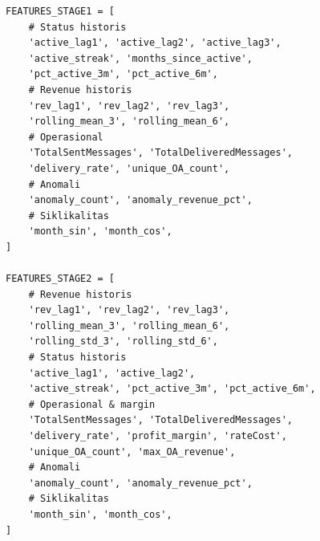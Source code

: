 \begin{lstlisting}[style=pycode,caption={Definisi daftar fitur Stage 1 dan Stage 2}]
FEATURES_STAGE1 = [
    # Status historis
    'active_lag1', 'active_lag2', 'active_lag3',
    'active_streak', 'months_since_active',
    'pct_active_3m', 'pct_active_6m',
    # Revenue historis
    'rev_lag1', 'rev_lag2', 'rev_lag3',
    'rolling_mean_3', 'rolling_mean_6',
    # Operasional
    'TotalSentMessages', 'TotalDeliveredMessages',
    'delivery_rate', 'unique_OA_count',
    # Anomali
    'anomaly_count', 'anomaly_revenue_pct',
    # Siklikalitas
    'month_sin', 'month_cos',
]

FEATURES_STAGE2 = [
    # Revenue historis
    'rev_lag1', 'rev_lag2', 'rev_lag3',
    'rolling_mean_3', 'rolling_mean_6',
    'rolling_std_3', 'rolling_std_6',
    # Status historis
    'active_lag1', 'active_lag2',
    'active_streak', 'pct_active_3m', 'pct_active_6m',
    # Operasional & margin
    'TotalSentMessages', 'TotalDeliveredMessages',
    'delivery_rate', 'profit_margin', 'rateCost',
    'unique_OA_count', 'max_OA_revenue',
    # Anomali
    'anomaly_count', 'anomaly_revenue_pct',
    # Siklikalitas
    'month_sin', 'month_cos',
]
\end{lstlisting}

